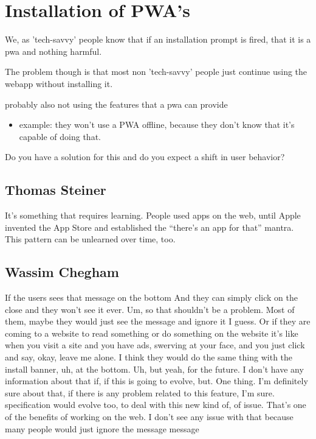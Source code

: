 	\section{Installation of PWA's}
		We, as 'tech-savvy' people know that if an installation prompt is fired, that it is a pwa and nothing harmful.
		
		The problem though is that most non 'tech-savvy' people just continue using the webapp without installing it.
		
		probably also not using the features that a pwa can provide 
		\begin{itemize}
			\item example: they won't use a PWA offline, because they don't know that it's capable of doing that.
		\end{itemize} 
				
		Do you have a solution for this and do you expect a shift in user behavior?
			
		\subsection{Thomas Steiner}
			It’s something that requires learning. People used apps on the web, until Apple invented the App Store and established the “there’s an app for that” mantra. This pattern can be unlearned over time, too.
		
		\subsection{Wassim Chegham}
			If the users sees that message on the bottom And they can simply click on the close and they won't see it ever. Um, so that shouldn't be a problem. Most of them, maybe they would just see the message and ignore it I guess. Or if they are coming to a website to read something or do something on the website it's like when you visit a site and you have ads, swerving at your face, and you just click and say, okay, leave me alone. I think they would do the same thing with the install banner, uh, at the bottom. Uh, but yeah, for the future. I don't have any information about that if, if this is going to evolve, but. One thing. I'm definitely sure about that, if there is any problem related to this feature, I'm sure. specification would evolve too, to deal with this new kind of, of issue. That's one of the benefits of working on the web.  I don't see any issue with that because many people would just ignore the message message
			
